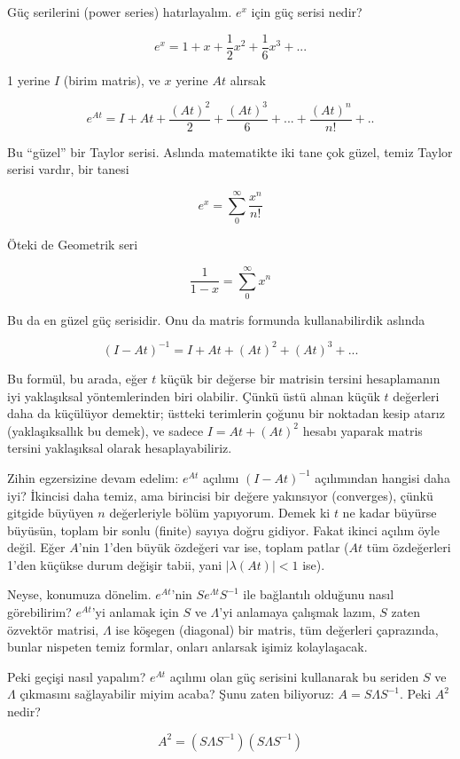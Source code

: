\documentclass[12pt,fleqn]{article}\usepackage{../../common}
\begin{document}
Güç serilerini (power series) hatırlayalım. $e^{x}$ için güç serisi nedir? 

$$ e^x = 1 + x + \frac{1}{2}x^2 + \frac{1}{6}x^3 + ... $$

1 yerine $I$ (birim matris), ve $x$ yerine $At$ alırsak

$$ e^{At} = I + At + \frac{(At)^2}{2} + \frac{(At)^3}{6} + ... +
 \frac{(At)^n}{n!} + ..
$$

Bu ``güzel'' bir Taylor serisi. Aslında matematikte iki tane çok güzel,
temiz Taylor serisi vardır, bir tanesi

$$ e^x = \sum_0^{\infty} \frac{x^n}{n!} $$

Öteki de Geometrik seri

$$ \frac{1}{1-x} = \sum_0^{\infty} x^n$$

Bu da en güzel güç serisidir. Onu da matris formunda kullanabilirdik aslında

$$ (I-At)^{-1} = I + At + (At)^2 + (At)^3 + ... $$

Bu formül, bu arada, eğer $t$ küçük bir değerse bir matrisin tersini
hesaplamanın iyi yaklaşıksal yöntemlerinden biri olabilir. Çünkü üstü
alınan küçük $t$ değerleri daha da küçülüyor demektir; üstteki terimlerin
çoğunu bir noktadan kesip atarız (yaklaşıksallık bu demek), ve sadece $I =
At + (At)^2$ hesabı yaparak matris tersini yaklaşıksal olarak
hesaplayabiliriz.

Zihin egzersizine devam edelim: $e^{At}$ açılımı $(I-At)^{-1}$ açılımından
hangisi daha iyi? İkincisi daha temiz, ama birincisi bir değere yakınsıyor
(converges), çünkü gitgide büyüyen $n$ değerleriyle bölüm yapıyorum. Demek
ki $t$ ne kadar büyürse büyüsün, toplam bir sonlu (finite) sayıya doğru
gidiyor. Fakat ikinci açılım öyle değil. Eğer $A$'nin 1'den büyük özdeğeri
var ise, toplam patlar ($At$ tüm özdeğerleri 1'den küçükse durum değişir
tabii, yani $|\lambda(At)| < 1$ ise).

Neyse, konumuza dönelim. $e^{At}$'nin $Se^{\Lambda t}S^{-1}$ ile bağlantılı
olduğunu nasıl görebilirim? $e^{At}$'yi anlamak için $S$ ve $\Lambda$'yi
anlamaya çalışmak lazım, $S$ zaten özvektör matrisi, $\Lambda$ ise köşegen
(diagonal) bir matris, tüm değerleri çaprazında, bunlar nispeten temiz
formlar, onları anlarsak işimiz kolaylaşacak.

Peki geçişi nasıl yapalım? $e^{At}$ açılımı olan güç serisini kullanarak bu
seriden $S$ ve $\Lambda$ çıkmasını sağlayabilir miyim acaba? Şunu zaten
biliyoruz: $A = S \Lambda S^{-1}$. Peki $A^2$ nedir?

$$ A^2 = (S \Lambda S^{-1})(S \Lambda S^{-1}) $$
\end{document}
